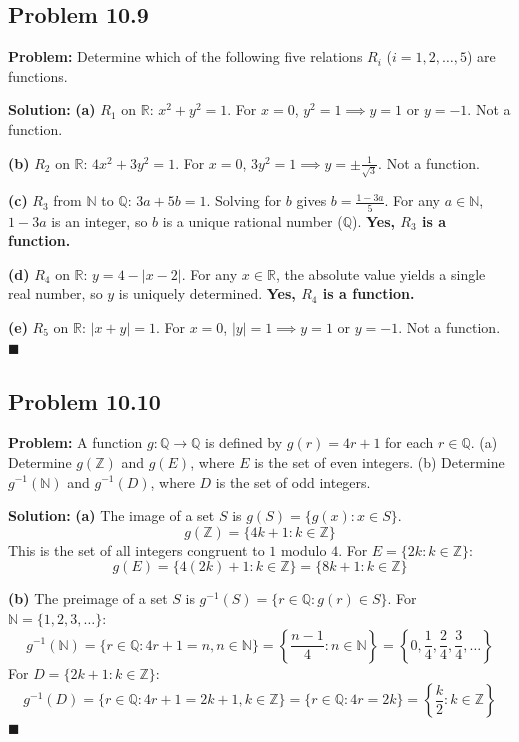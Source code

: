 \documentclass[11pt, a4paper]{article}
\theoremstyle{definition}
\theoremstyle{remark}
\newcommand{\R}{\mathbb{R}}
\newcommand{\N}{\mathbb{N}}
\newcommand{\Z}{\mathbb{Z}}
\newcommand{\Q}{\mathbb{Q}}
\begin{document}
\subsection{Problem 10.9}
\textbf{Problem:} Determine which of the following five relations $R_i$ ($i = 1, 2, \dots, 5$) are functions.

\textbf{Solution:}
\textbf{(a)} $R_1$ on $\R$: $x^2 + y^2 = 1$. For $x = 0$, $y^2 = 1 \implies y = 1$ or $y = -1$. Not a function.

\textbf{(b)} $R_2$ on $\R$: $4x^2 + 3y^2 = 1$. For $x = 0$, $3y^2 = 1 \implies y = \pm \frac{1}{\sqrt{3}}$. Not a function.

\textbf{(c)} $R_3$ from $\N$ to $\Q$: $3a + 5b = 1$. Solving for $b$ gives $b = \frac{1 - 3a}{5}$. For any $a \in \N$, $1 - 3a$ is an integer, so $b$ is a unique rational number ($\Q$). \textbf{Yes, $R_3$ is a function.}

\textbf{(d)} $R_4$ on $\R$: $y = 4 - |x - 2|$. For any $x \in \R$, the absolute value yields a single real number, so $y$ is uniquely determined. \textbf{Yes, $R_4$ is a function.}

\textbf{(e)} $R_5$ on $\R$: $|x + y| = 1$. For $x = 0$, $|y| = 1 \implies y = 1$ or $y = -1$. Not a function.
$\blacksquare$

\subsection{Problem 10.10}
\textbf{Problem:} A function $g : \Q \to \Q$ is defined by $g(r) = 4r + 1$ for each $r \in \Q$.
(a) Determine $g(\Z)$ and $g(E)$, where $E$ is the set of even integers.
(b) Determine $g^{-1}(\N)$ and $g^{-1}(D)$, where $D$ is the set of odd integers.

\textbf{Solution:}
\textbf{(a)} The image of a set $S$ is $g(S) = \{g(x) : x \in S\}$.
\[ g(\Z) = \{4k + 1 : k \in \Z\} \]
This is the set of all integers congruent to $1$ modulo $4$.
For $E = \{2k : k \in \Z\}$:
\[ g(E) = \{4(2k) + 1 : k \in \Z\} = \{8k + 1 : k \in \Z\} \]

\textbf{(b)} The preimage of a set $S$ is $g^{-1}(S) = \{r \in \Q : g(r) \in S\}$.
For $\N = \{1, 2, 3, \dots\}$:
\[ g^{-1}(\N) = \{r \in \Q : 4r + 1 = n, n \in \N\} = \left\{ \frac{n - 1}{4} : n \in \N \right\} = \left\{ 0, \frac{1}{4}, \frac{2}{4}, \frac{3}{4}, \dots \right\} \]
For $D = \{2k + 1 : k \in \Z\}$:
\[ g^{-1}(D) = \{r \in \Q : 4r + 1 = 2k + 1, k \in \Z\} = \{r \in \Q : 4r = 2k\} = \left\{ \frac{k}{2} : k \in \Z \right\} \]
$\blacksquare$
\end{document}
